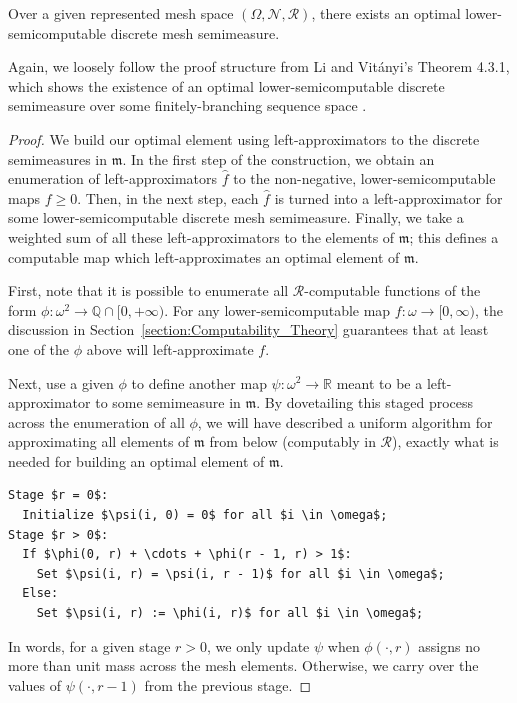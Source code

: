 \begin{theorem}
    Over a given represented mesh space $(\Omega, \mathcal{N}, \mathscr{R})$, there exists an optimal lower-semicomputable discrete mesh semimeasure.
    \label{prop:exists_optimal_discrete}
\end{theorem}
Again, we loosely follow the proof structure from Li and Vit{\'a}nyi's Theorem 4.3.1, which shows the existence of an optimal lower-semicomputable discrete semimeasure over some finitely-branching sequence space \cite{LV08}.

\begin{proof}
    We build our optimal element using left-approximators to the discrete semimeasures in $\mathfrak{m}$. In the first step of the construction, we obtain an enumeration of left-approximators $\widehat{f}$ to the non-negative, lower-semicomputable maps $f \geq 0$. Then, in the next step, each $\widehat{f}$ is turned into a left-approximator for some lower-semicomputable discrete mesh semimeasure. Finally, we take a weighted sum of all these left-approximators to the elements of $\mathfrak{m}$; this defines a computable map which left-approximates an optimal element of $\mathfrak{m}$.

    First, note that it is possible to enumerate all $\mathscr{R}$-computable functions of the form $\phi : \omega^2 \to \mathbb{Q} \cap [0, +\infty)$. For any lower-semicomputable map $f: \omega \to [0, \infty)$, the discussion in Section~\ref{section:Computability_Theory} guarantees that at least one of the $\phi$ above will left-approximate $f$.

    Next, use a given $\phi$ to define another map $\psi : \omega^2 \to \mathbb{R}$ meant to be a left-approximator to some semimeasure in $\mathfrak{m}$. By dovetailing this staged process across the enumeration of all $\phi$, we will have described a uniform algorithm for approximating all elements of $\mathfrak{m}$ from below (computably in $\mathscr{R}$), exactly what is needed for building an optimal element of $\mathfrak{m}$. 

    \begin{lstlisting}[mathescape=true]
Stage $r = 0$: 
  Initialize $\psi(i, 0) = 0$ for all $i \in \omega$;
Stage $r > 0$:
  If $\phi(0, r) + \cdots + \phi(r - 1, r) > 1$:
    Set $\psi(i, r) = \psi(i, r - 1)$ for all $i \in \omega$; 
  Else: 
    Set $\psi(i, r) := \phi(i, r)$ for all $i \in \omega$;
    \end{lstlisting}

    In words, for a given stage $r > 0$, we only update $\psi$ when $\phi(\cdot, r)$ assigns no more than unit mass across the mesh elements. Otherwise, we carry over the values of $\psi(\cdot, r - 1)$ from the previous stage.


\end{proof}
